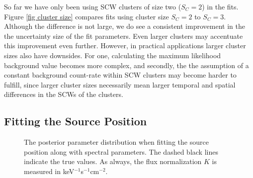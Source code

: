 \documentclass{report}
\begin{document}
So far we have only been using SCW clusters of size two ($S_C=2$) in the fits. Figure \ref{fig cluster size} compares fits using cluster size $S_C=2$ to $S_C=3$. Although the difference is not large, we do see a consistent improvement in the the uncertainty size of the fit parameters. Even larger clusters may accentuate this improvement even further. However, in practical applications larger cluster sizes also have downsides. For one, calculating the maximum likelihood background value becomes more complex, and secondly, the the assumption of a constant background count-rate within SCW clusters may become harder to fulfill, since larger cluster sizes necessarily mean larger temporal and spatial differences in the SCWs of the clusters.


\subsection{Fitting the Source Position}

\begin{figure}[h]
  \centering
  \caption{The posterior parameter distribution when fitting the source position along with spectral parameters. The dashed black lines indicate the true values. As always, the flux normalization $K$ is measured in keV$^{-1}$s$^{-1}$cm$^{-2}$.}
  \label{fig pos fit}
\end{figure}
\end{document}
